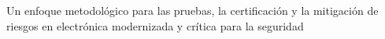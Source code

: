 Un enfoque metodológico para las pruebas, la certificación y la mitigación de riesgos en electrónica modernizada y crítica para la seguridad